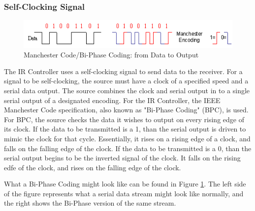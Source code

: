 \documentclass[]{article}
\begin{document}
\subsubsection{Self-Clocking Signal}
\begin{figure}[H]\centering
    \includegraphics[width=\linewidth]{figures/Manchester_Code.png}
    \caption{Manchester Code/Bi-Phase Coding: from Data to Output\cite{manchesterCode}} 
    \label{fig:biPhaseExample}
\end{figure}
\label{subsubsec:selfClockingSignal}
The IR Controller uses a self-clocking signal to send data to the receiver.
For a signal to be self-clocking, the source must have a clock of a specified speed and a serial data output.
The source combines the clock and serial output in to a single serial output of a designated encoding.
For the IR Controller, the IEEE Manchester Code specification, also known as "Bi-Phase Coding" (BPC), is used.
For BPC, the source checks the data it wishes to output on every rising edge of its clock.
If the data to be transmitted is a 1, than the serial output is driven to mimic the clock for that cycle.
Essentially, it rises on a rising edge of a clock, and falls on the falling edge of the clock.
If the data to be transmitted is a 0, than the serial output begins to be the inverted signal of the clock.
It falls on the rising edfe of the clock, and rises on the falling edge of the clock. 

What a Bi-Phase Coding might look like can be found in Figure \ref{fig:biPhaseExample}.
The left side of the figure represents what a serial data stream might look like normally, and the right shows the Bi-Phase version of the same stream.
\end{document}
